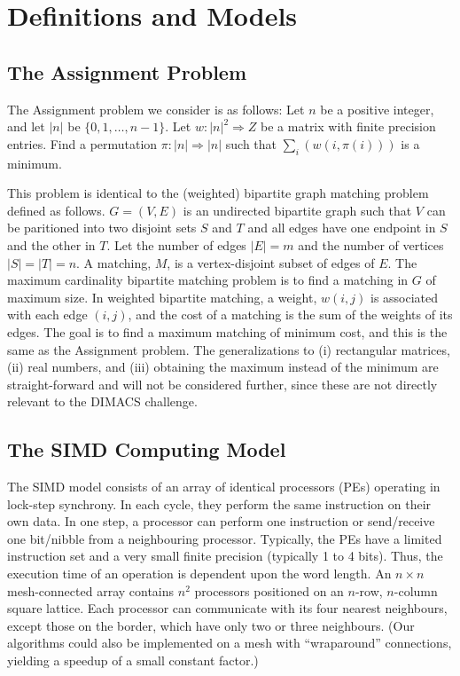 \section{Definitions and Models}
\label{defns}

\subsection{The Assignment Problem}
\label{assign_prob}
The Assignment problem we consider is as follows:  
Let $n$ be a positive integer, and let $|n|$ be $\{0, 1, \ldots, n-1\}$.
Let $w:  |n|^2 \Rightarrow Z$ be a matrix with finite precision entries.  
Find a permutation $\pi :  |n| \Rightarrow |n|$ such that 
$\sum_i (w(i, \pi(i)))$ is a minimum.  

This problem is identical to the (weighted) bipartite graph 
matching problem defined as follows. 
$G = (V, E)$ is an undirected bipartite graph such that $V$ can be 
paritioned into two disjoint sets $S$ and $T$ and all edges have 
one endpoint in $S$ and the other in $T$.
Let the number of edges $|E| = m$ and the number of vertices 
$|S| = |T| = n$.  A matching, $M$, is a 
vertex-disjoint subset of edges of $E$.  
The maximum cardinality bipartite matching problem is to find a 
matching in $G$ of maximum size.  In weighted bipartite matching, 
a weight,  $w(i,j)$ is associated with each edge $(i,j)$, and the 
cost of a matching is the sum of the weights of its edges.  The goal is to 
find a maximum matching of minimum cost, and this is the 
same as the Assignment problem. The generalizations to 
(i) rectangular matrices, 
(ii) real numbers, and 
(iii) obtaining the maximum instead of the minimum 
are straight-forward and will not be considered further, since 
these are not directly relevant to the DIMACS challenge.

\subsection{The SIMD Computing Model}
\label{model}


The SIMD model consists of an 
array of identical processors (PEs) operating in lock-step synchrony.
In each cycle, they perform the same instruction on their own
data.  In one step, a processor can perform 
one instruction or send/receive one bit/nibble from a neighbouring
processor.  Typically, the PEs have 
a limited instruction set and a very small finite precision (typically 
1 to 4 bits).  Thus, the execution time of an operation is dependent 
upon the word length.  An $n \times n$ mesh-connected array contains 
$n^2$ processors positioned on an $n$-row, $n$-column square lattice.  
Each processor can communicate with its four nearest 
neighbours, except those on the border, which have only two or three 
neighbours.  (Our algorithms could also be implemented on a mesh with 
``wraparound'' connections, yielding a speedup of a small constant factor.)

